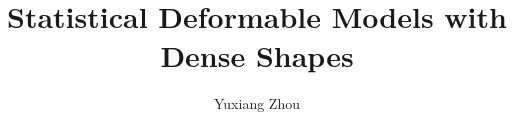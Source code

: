 \documentclass[a4paper,12pt,twoside]{report}
\begin{document}
\title{\LARGE {\bf Statistical Deformable Models with Dense Shapes}\\
 \vspace*{6mm}
}

\author{Yuxiang Zhou}

\normallinespacing
\maketitle

\preface





\body









\appendix




\end{document}
